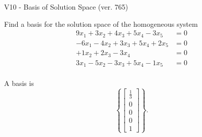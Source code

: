 \begin{exercise}
  \begin{exerciseTitle}V10 - Basis of Solution Space (ver. 765)\end{exerciseTitle}
  \begin{exerciseStatement}
    Find a basis for the solution space of the homogeneous system 
\begin{align*}
 9 x_ 1 + 3 x_ 2 + 4 x_ 3 + 5 x_ 4 -3 x_ 5 &= 0  \\ 
  -6 x_ 1 -4 x_ 2 + 3 x_ 3 + 5 x_ 4 + 2 x_ 5 &= 0  \\ 
  + 1 x_ 2 + 2 x_ 3 -3 x_ 4 &= 0  \\ 
  3 x_ 1 -5 x_ 2 -3 x_ 3 + 5 x_ 4 -1 x_ 5 &= 0  \\ 
 \end{align*}


 
  \end{exerciseStatement}

  \begin{exerciseAnswer}
   A basis is   
\[\left\{\left[\begin{array}{c}
\frac{1}{3} \\
0 \\
0 \\
0 \\
1
\end{array}\right]\right\}.\]

  


  \end{exerciseAnswer}
\end{exercise}